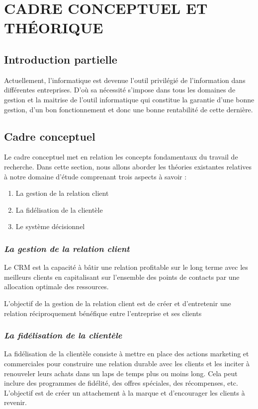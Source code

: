\chapter[CADRE CONCEPTUEL ET THÉORIQUE]{CADRE CONCEPTUEL ET THÉORIQUE}    
    \section{Introduction partielle}
    Actuellement, l’informatique est devenue l’outil privilégié de l’information dans
    différentes entreprises. D’où sa nécessité s’impose dans tous les domaines de gestion et la
    maitrise de l’outil informatique qui constitue la garantie d’une bonne gestion, d’un bon
    fonctionnement et donc une bonne rentabilité de cette dernière.
    \section[Cadre Conceptuel]{Cadre conceptuel}
    Le cadre conceptuel met en relation les concepts fondamentaux du travail de
    recherche. Dans cette section, nous allons aborder les théories existantes relatives à notre
    domaine d’étude comprenant trois aspects à savoir : 
    \newline
        \begin{enumerate}
            \item La gestion de la relation client
            \item La fidélisation de la clientèle
            \item Le système décisionnel
        \end{enumerate} 
        \subsection[La relation client]{\textit{La gestion de la relation client}}
        Le CRM est la capacité à bâtir une relation profitable sur le long terme 
        avec les meilleurs clients en capitalisant sur l’ensemble des points de
        contacts par une allocation optimale des ressources. \cite*{Lefebure2005}
        \newline
        
        L’objectif de la gestion de la relation client est de créer et d’entretenir
        une relation réciproquement bénéfique entre l’entreprise et ses clients
        \subsection[La fidélisation de la clientèle]{\textit{La fidélisation de la clientèle}}
        La fidélisation de la clientèle consiste à mettre en place des actions marketing et commerciales
        pour construire une relation durable avec les clients et les inciter à renouveler
        leurs achats dans un laps de temps plus ou moins long. \cite*{Maud2022} Cela peut inclure des programmes
        de fidélité, des offres spéciales, des récompenses, etc. L’objectif est de
        créer un attachement à la marque et d’encourager les clients à revenir.
        \newline

